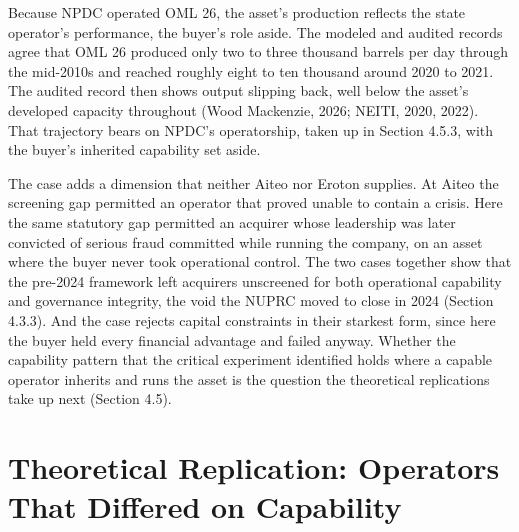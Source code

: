 Because NPDC operated OML 26, the asset's production reflects the state
operator's performance, the buyer's role aside. The modeled and audited
records agree that OML 26 produced only two to three thousand barrels
per day through the mid-2010s and reached roughly eight to ten thousand
around 2020 to 2021. The audited record then shows output slipping back,
well below the asset's developed capacity throughout (Wood Mackenzie,
2026; NEITI, 2020, 2022). That trajectory bears on NPDC's operatorship,
taken up in Section 4.5.3, with the buyer's inherited capability set
aside.

The case adds a dimension that neither Aiteo nor Eroton supplies. At
Aiteo the screening gap permitted an operator that proved unable to
contain a crisis. Here the same statutory gap permitted an acquirer
whose leadership was later convicted of serious fraud committed while
running the company, on an asset where the buyer never took operational
control. The two cases together show that the pre-2024 framework left
acquirers unscreened for both operational capability and governance
integrity, the void the NUPRC moved to close in 2024 (Section 4.3.3).
And the case rejects capital constraints in their starkest form, since
here the buyer held every financial advantage and failed anyway. Whether
the capability pattern that the critical experiment identified holds
where a capable operator inherits and runs the asset is the question the
theoretical replications take up next (Section 4.5).

\hypertarget{theoretical-replication-operators-that-differed-on-capability}{%
\section{Theoretical Replication: Operators That Differed on
Capability}\label{theoretical-replication-operators-that-differed-on-capability}}

